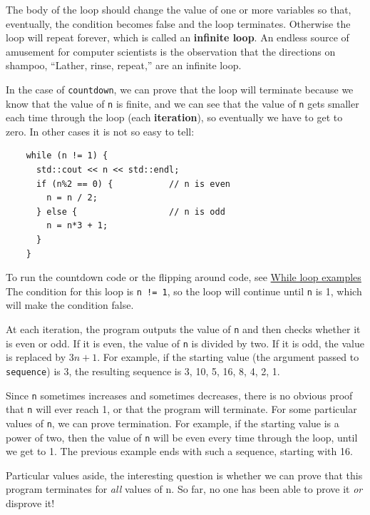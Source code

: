 
The body of the loop should change the value of
one or more variables so that, eventually, the condition becomes
false and the loop terminates.  Otherwise the loop will repeat
forever, which is called an {\bf infinite loop}.  An endless
source of amusement for computer scientists is the observation
that the directions on shampoo, ``Lather, rinse, repeat,'' are
an infinite loop.

In the case of {\tt countdown}, we can prove that the loop
will terminate because we know that the value of {\tt n} is
finite, and we can see that the value of {\tt n} gets smaller
each time through the loop (each {\bf iteration}), so
eventually we have to get to zero.  In other cases it is not
so easy to tell:

\begin{verbatim}
    while (n != 1) {
      std::cout << n << std::endl;
      if (n%2 == 0) {           // n is even
        n = n / 2;
      } else {                  // n is odd
        n = n*3 + 1;
      }
    }

\end{verbatim}
%
To run the countdown code or the flipping around code, see \href{https://replit.com/@lpatacch/While-Loop-Examples#whilestatement.cpp}{While loop examples}
The condition for this loop is {\tt n != 1}, so the loop
will continue until {\tt n} is 1, which will make the condition
false.

At each iteration, the program outputs the value of {\tt n} and then
checks whether it is even or odd.  If it is even, the value of
{\tt n} is divided by two.  If it is odd, the value is replaced
by $3n+1$.  For example, if the starting value (the argument passed
to {\tt sequence}) is 3, the resulting sequence is
3, 10, 5, 16, 8, 4, 2, 1.

Since {\tt n} sometimes increases and sometimes decreases, there is no
obvious proof that {\tt n} will ever reach 1, or that the program will
terminate.  For some particular values of {\tt n}, we can prove
termination.  For example, if the starting value is a power of two, then
the value of {\tt n} will be even every time through the loop, until
we get to 1.  The previous example ends with such a sequence,
starting with 16.

Particular values aside, the interesting question is whether
we can prove that this program terminates for {\em all} values of n.
So far, no one has been able to prove it {\em or} disprove it!

